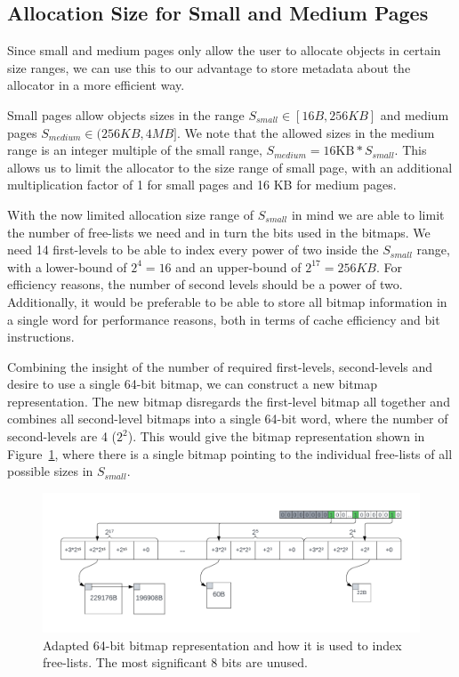 
\subsection{Allocation Size for Small and Medium Pages}

Since small and medium pages only allow the user to allocate objects in certain size ranges, we can use this to our advantage to store metadata about the allocator in a more efficient way.

Small pages allow objects sizes in the range $S_{small} \in [16B, 256KB]$ and medium pages $S_{medium} \in (256KB, 4MB]$. We note that the allowed sizes in the medium range is an integer multiple of the small range, $S_{medium} = \text{16KB} * S_{small}$. This allows us to limit the allocator to the size range of small page, with an additional multiplication factor of 1 for small pages and 16 KB for medium pages.

With the now limited allocation size range of $S_{small}$ in mind we are able to limit the number of free-lists we need and in turn the bits used in the bitmaps. We need 14 first-levels to be able to index every power of two inside the $S_{small}$ range, with a lower-bound of $2^4 = 16$ and an upper-bound of $2^17 = 256KB$. For efficiency reasons, the number of second levels should be a power of two. Additionally, it would be preferable to be able to store all bitmap information in a single word for performance reasons, both in terms of cache efficiency and bit instructions.


Combining the insight of the number of required first-levels, second-levels and desire to use a single 64-bit bitmap, we can construct a new bitmap representation. The new bitmap disregards the first-level bitmap all together and combines all second-level bitmaps into a single 64-bit word, where the number of second-levels are 4 ($2^2$). This would give the bitmap representation shown in Figure~\ref{fig:adapted_bitmap}, where there is a single bitmap pointing to the individual free-lists of all possible sizes in $S_{small}$.

\begin{figure}[H]
    \centering
    \includegraphics[width=1\textwidth]{figures/adapted_bitmap.png}
    \caption{Adapted 64-bit bitmap representation and how it is used to index free-lists. The most significant 8 bits are unused.}
    \label{fig:adapted_bitmap}
\end{figure}

